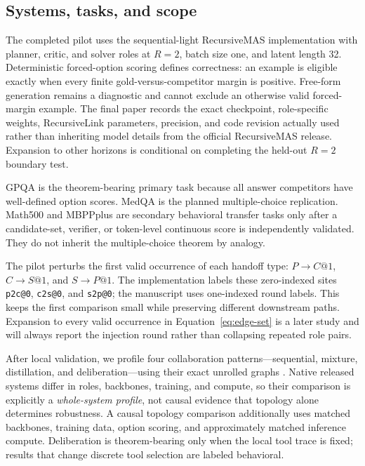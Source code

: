 \documentclass[11pt]{article}
\begin{document}
\subsection{Systems, tasks, and scope}

The completed pilot uses the sequential-light RecursiveMAS implementation with
planner, critic, and solver roles at $R=2$, batch size one, and latent length
32. Deterministic forced-option scoring defines correctness: an example is
eligible exactly when every finite gold-versus-competitor margin is positive.
Free-form generation remains a diagnostic and cannot exclude an otherwise
valid forced-margin example. The final paper records the exact checkpoint,
role-specific weights, RecursiveLink parameters, precision, and code revision
actually used rather than inheriting model details from the official
RecursiveMAS release. Expansion to other horizons is conditional on completing
the held-out $R=2$ boundary test.

GPQA is the theorem-bearing primary task because all answer competitors have
well-defined option scores. MedQA is the planned multiple-choice replication.
Math500 and MBPPplus are secondary behavioral transfer tasks only after a
candidate-set, verifier, or token-level continuous score is independently
validated. They do not inherit the multiple-choice theorem by analogy.

The pilot perturbs the first valid occurrence of each handoff type:
$P{\to}C@1$, $C{\to}S@1$, and $S{\to}P@1$. The implementation labels these
zero-indexed sites \texttt{p2c@0}, \texttt{c2s@0}, and \texttt{s2p@0}; the
manuscript uses one-indexed round labels. This keeps the first comparison small
while preserving different downstream paths. Expansion to every valid
occurrence in Equation~\eqref{eq:edge-set} is a later study and will always
report the injection round rather than collapsing repeated role pairs.

After local validation, we profile four collaboration patterns---sequential,
mixture, distillation, and deliberation---using their exact unrolled graphs
\cite{yang2026recursivemas}. Native released systems differ in roles,
backbones, training, and compute, so their comparison is explicitly a
\emph{whole-system profile}, not causal evidence that topology alone determines
robustness. A causal topology comparison additionally uses matched backbones,
training data, option scoring, and approximately matched inference compute.
Deliberation is theorem-bearing only when the local tool trace is fixed; results
that change discrete tool selection are labeled behavioral.
\end{document}
